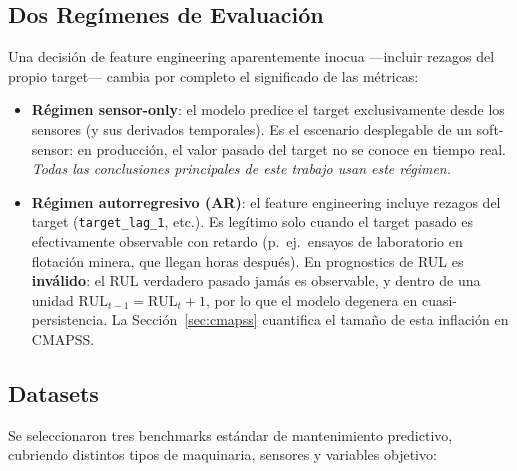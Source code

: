 \documentclass[10pt]{article}
\begin{document}
\subsection{Dos Regímenes de Evaluación}
\label{sec:regimes}

Una decisión de feature engineering aparentemente inocua ---incluir rezagos del propio target--- cambia por completo el significado de las métricas:

\begin{itemize}
    \item \textbf{Régimen sensor-only}: el modelo predice el target exclusivamente desde los sensores (y sus derivados temporales). Es el escenario desplegable de un soft-sensor: en producción, el valor pasado del target no se conoce en tiempo real. \emph{Todas las conclusiones principales de este trabajo usan este régimen.}
    \item \textbf{Régimen autorregresivo (AR)}: el feature engineering incluye rezagos del target (\texttt{target\_lag\_1}, etc.). Es legítimo solo cuando el target pasado es efectivamente observable con retardo (p.\ ej.\ ensayos de laboratorio en flotación minera, que llegan horas después). En prognostics de RUL es \textbf{inválido}: el RUL verdadero pasado jamás es observable, y dentro de una unidad $\mathrm{RUL}_{t-1} = \mathrm{RUL}_t + 1$, por lo que el modelo degenera en cuasi-persistencia. La Sección~\ref{sec:cmapss} cuantifica el tamaño de esta inflación en CMAPSS.
\end{itemize}

\subsection{Datasets}

Se seleccionaron tres benchmarks estándar de mantenimiento predictivo, cubriendo distintos tipos de maquinaria, sensores y variables objetivo:
\end{document}
